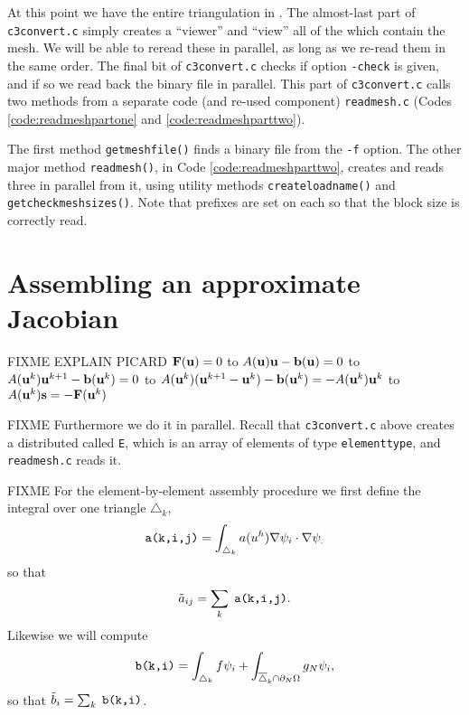 At this point we have the entire triangulation in \PETSc \pVecs.  The almost-last part of \texttt{c3convert.c} simply creates a \PETSc ``viewer'' and ``view'' all of the \pVecs which contain the mesh.  We will be able to reread these \pVecs in parallel, as long as we re-read them in the same order.  The final bit of \texttt{c3convert.c} checks if option \texttt{-check} is given, and if so we read back the binary file in parallel.  This part of \texttt{c3convert.c} calls two methods from a separate code (and re-used component) \texttt{readmesh.c} (Codes \ref{code:readmeshpartone} and \ref{code:readmeshparttwo}).

The first method \texttt{getmeshfile()} finds a \PETSc binary file from the \texttt{-f} option.  The other major method \texttt{readmesh()}, in Code \ref{code:readmeshparttwo}, creates and reads three \pVecs in parallel from it, using utility methods \texttt{createloadname()} and \texttt{getcheckmeshsizes()}.  Note that prefixes are set on each \pVec so that the block size is correctly read.




\section{Assembling an approximate Jacobian}

FIXME EXPLAIN PICARD $\mathbf{F}(\mathbf{u})=0$ to $A(\mathbf{u}) \mathbf{u} - \mathbf{b}(\mathbf{u})=0$ to $A(\mathbf{u}^k) \mathbf{u}^{k+1} - \mathbf{b}(\mathbf{u}^k)=0$ to $A(\mathbf{u}^k) (\mathbf{u}^{k+1}-\mathbf{u}^k) - \mathbf{b}(\mathbf{u}^k)= - A(\mathbf{u}^k) \mathbf{u}^k$ to $A(\mathbf{u}^k) \mathbf{s} = -\mathbf{F}(\mathbf{u}^k)$

FIXME Furthermore we do it in parallel.  Recall that \texttt{c3convert.c} above creates a distributed \pVec called \texttt{E}, which is an array of elements of type \texttt{elementtype}, and \texttt{readmesh.c} reads it.

FIXME For the element-by-element assembly procedure we first define the integral over one triangle $\triangle_k$,
\begin{equation}
\text{\texttt{a(k,i,j)}} = \int_{\triangle_k} a(u^h) \nabla \psi_i \cdot \nabla \psi_. \label{aelementintegral}
\end{equation}
so that
    $$\tilde a_{ij} = \sum_k \phantom{.}\text{\texttt{a(k,i,j)}}.$$
Likewise we will compute
\begin{equation}
\text{\texttt{b(k,i)}} = \int_{\triangle_k} f \psi_i + \int_{\overline{\triangle}_k \cap \partial_N\Omega} g_N \psi_i, \label{belementintegral}
\end{equation}
so that $\tilde b_i = \sum_{k} \;\text{\texttt{b(k,i)}}$.

